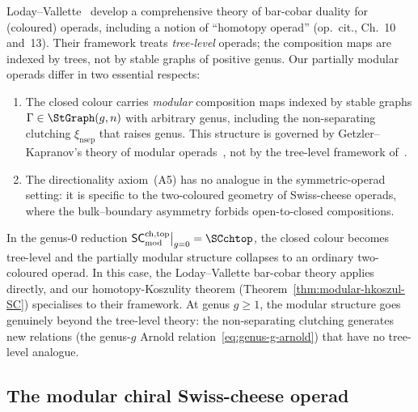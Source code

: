 \begin{remark}
\label{rem:vallette-comparison}
Loday--Vallette~\cite{LV12} develop a comprehensive theory of
bar-cobar duality for (coloured) operads, including a notion of
``homotopy operad'' (op.~cit., Ch.~10 and~13). Their framework
treats \emph{tree-level} operads; the composition maps are
indexed by trees, not by stable graphs of positive genus.
Our partially modular operads differ in two essential respects:
\begin{enumerate}[label=\textup{(\roman*)}]
\item The closed colour carries \emph{modular} composition maps
 indexed by stable graphs $\Gamma \in \StGraph(g,n)$ with
 arbitrary genus, including the non-separating clutching
 $\xi_{\mathrm{nsep}}$ that raises genus. This structure is
 governed by Getzler--Kapranov's theory of modular
 operads~\cite{GK98}, not by the tree-level framework of~\cite{LV12}.
\item The directionality axiom~(A5) has no analogue in the
 symmetric-operad setting: it is specific to the two-coloured
 geometry of Swiss-cheese operads, where the bulk--boundary
 asymmetry forbids open-to-closed compositions.
\end{enumerate}
In the genus-$0$ reduction $\SCmod\big|_{g=0} = \SCchtop$,
the closed colour becomes tree-level and the partially modular
structure collapses to an ordinary two-coloured operad. In
this case, the Loday--Vallette bar-cobar theory applies directly,
and our homotopy-Koszulity theorem
(Theorem~\ref{thm:modular-hkoszul-SC}) specialises to their
framework. At genus $g \ge 1$, the modular structure goes
genuinely beyond the tree-level theory: the non-separating
clutching generates new relations (the genus-$g$ Arnold
relation~\eqref{eq:genus-g-arnold}) that have no tree-level
analogue.
\end{remark}


\subsection{The modular chiral Swiss-cheese operad}
\label{subsec:sc-mod-def}


